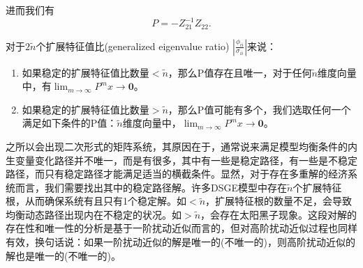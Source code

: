 \begin{remark}[QZ分解法求解二次矩阵方程系统]
  进而我们有
  \begin{equation*}
    P = -Z_{21}^{-1}Z_{22}.
  \end{equation*}

  对于$2\tilde{n}$个扩展特征值比(generalized eigenvalue ratio) $\left| \frac{\phi_{ii}}{\sigma_{ii}} \right|$来说：
  \begin{enumerate}
    \item 如果稳定的扩展特征值比数量$< \tilde{n}$，那么P值存在且唯一，对于任何$\tilde{n}$维度向量中，有$\lim_{m\rightarrow \infty}P^{m} x \rightarrow \bm{0}$。
    \item 如果稳定的扩展特征值比数量$> \tilde{n}$，那么P值可能有多个，我们选取任何一个满足如下条件的P值：$\tilde{n}$维度向量中，$\lim_{m\rightarrow \infty}P^{m} x \rightarrow \bm{0}$。
  \end{enumerate}
\end{remark}

之所以会出现二次形式的矩阵系统，其原因在于，通常说来满足模型均衡条件的内生变量变化路径并不唯一，而是有很多\citep{Uhlig:1999vx, Galor:2007uw}，其中有一些是稳定路径，有一些是不稳定路径，而只有稳定路径才能满足适当的横截条件。显然，对于存在多重解的经济系统而言，我们需要找出其中的稳定路径解。许多DSGE模型中存在$\tilde{n}$个扩展特征根，从而确保系统有且只有1个稳定解。如$< \tilde{n}$，扩展特征根的数量不足，会导致均衡动态路径出现内在不稳定的状况。如$> \tilde{n}$，会存在太阳黑子现象\citep{Lubik:2003hk}。这段对解的存在性和唯一性的分析是基于一阶扰动近似而言的，但对高阶扰动近似过程也同样有效，换句话说：如果一阶扰动近似的解是唯一的(不唯一的)，则高阶扰动近似的解也是唯一的(不唯一的)。

